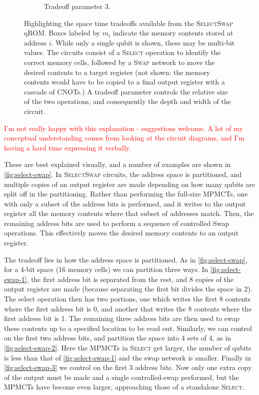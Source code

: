 \documentclass[a4paper,12pt]{article}
\newcommand\todo[1]{\textcolor{red}{#1}}
\begin{document}
\begin{figure}[ht!]
\begin{subfigure}[ht!]{\textwidth}
 \caption{Tradeoff parameter 3.}
 \label{fig:select-swap-3}
 \end{subfigure}
 \caption{Highlighting the space time tradeoffs available from the \textsc{SelectSwap} qROM. Boxes labeled by $m_i$ indicate the memory contents stored at address $i$. While only a single qubit is shown, these may be multi-bit values. The circuits consist of a \textsc{Select}  operation to identify the correct memory cells, followed by a \textsc{Swap}  network to move the desired contents to a target register (not shown: the memory contents would have to be copied to a final output register with a cascade of CNOTs.) A tradeoff parameter controls the relative size of the two operations, and consequently the depth and width of the circuit.}
 \label{fig:select-swap}
\end{figure} 

\todo{I'm not really happy with this explanation - suggestions welcome. A lot of my conceptual understanding comes from looking at the circuit diagrams, and I'm having a hard time expressing it verbally.}

These are best explained visually, and a number of examples are shown in \autoref{fig:select-swap}.
In \textsc{SelectSwap} circuits, the address space is partitioned, and multiple copies of an output register are made depending on how many qubits are split off in the partitioning.
Rather than performing the full-size MPMCTs, one with only a subset of the address bits is performed, and it writes to the output register all the memory contents where that subset of addresses match.
Then, the remaining address bits are used to perform a sequence of controlled Swap operations.
This effectively moves the desired memory contents to an output register.

The tradeoff lies in how the address space is partitioned.
As in \autoref{fig:select-swap}, for a 4-bit space (16 memory cells) we can partition three ways.
In \autoref{fig:select-swap-1}, the first address bit is separated from the rest, and 8 copies of the output register are made (because separating the first bit divides the space in 2).
The select operation then has two portions, one which writes the first 8 contents where the first address bit is 0, and another that writes the 8 contents where the first address bit is 1.
The remaining three address bits are then used to swap these contents up to a specified location to be read out.
Similarly, we can control on the first two address bits, and partition the space into 4 sets of 4, as in \autoref{fig:select-swap-2}. 
Here the MPMCTs in \textsc{Select} get larger, the number of qubits is less than that of \autoref{fig:select-swap-1} and the swap network is smaller.
Finally in \autoref{fig:select-swap-3} we control on the first 3 address bits. 
Now only one extra copy of the output must be made and a single controlled-swap performed, but the MPMCTs have become even larger, approaching those of a standalone \textsc{Select}.
\end{document}
